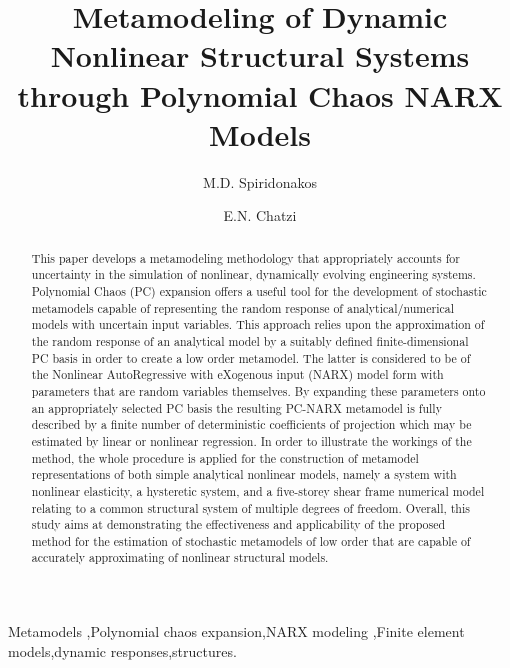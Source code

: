 \documentclass[preprint,3p,review,times,11pt]{elsarticle}
\begin{document}
\begin{frontmatter}


\begin{center}

\end{center}
\title{Metamodeling of Dynamic Nonlinear Structural Systems through Polynomial Chaos NARX Models}

 \author{M.D. Spiridonakos}
 \author{E.N. Chatzi}
\address{ETH Zurich, Institute of Structural Engineering,\\
  	Department of Civil, Environmental and Geomatic Engineering, \\ Stefano-Franscini-Platz 5, 8093 Zurich, Switzerland}

\vspace*{-3cm}

\begin{abstract}{
This paper develops a metamodeling methodology that appropriately accounts for uncertainty in the simulation of nonlinear, dynamically evolving engineering systems. Polynomial Chaos (PC) expansion offers a useful tool for the development of stochastic metamodels capable of representing the random response of analytical/numerical models with uncertain input variables. This approach relies upon the approximation of the random response of an analytical model by a suitably defined finite-dimensional PC basis in order to create a low order metamodel. The latter is considered to be of the Nonlinear AutoRegressive with eXogenous input (NARX) model form with parameters that are random variables themselves. By expanding these parameters onto an appropriately selected PC basis the resulting PC-NARX metamodel is fully described by a finite number of deterministic coefficients of projection which may be estimated by linear or nonlinear regression. In order to illustrate the workings of the method, the whole procedure is applied for the construction of metamodel representations of both simple analytical nonlinear models, namely a system with nonlinear elasticity, a hysteretic system, and a five-storey shear frame numerical model relating to a common structural system of multiple degrees of freedom. Overall, this study aims at demonstrating the effectiveness and applicability of the proposed method for the estimation of stochastic metamodels of low order that are capable of accurately approximating of nonlinear structural models. }
\end{abstract}

\vspace*{1cm}

\begin{keyword}
Metamodels \sep Polynomial chaos expansion\sep NARX modeling \sep Finite element models\sep dynamic responses\sep structures.
\end{keyword}

\end{frontmatter}
 
\end{document}
